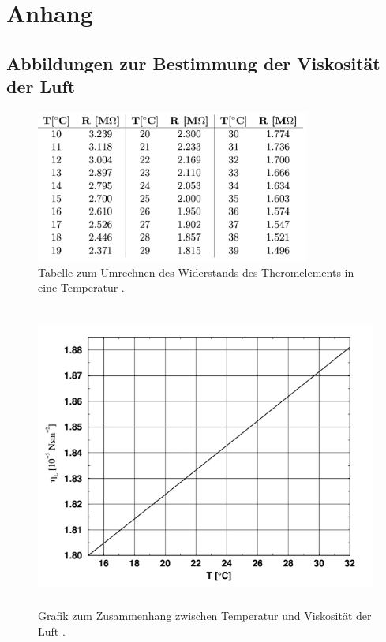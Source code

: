 \section{Anhang}
\label{sec:Anhang}
\subsection{Abbildungen zur Bestimmung der Viskosität der Luft}
\begin{figure}[H]
    \centering
    \includegraphics[height=5cm]{content/pics/R_T.png}
    \caption{Tabelle zum Umrechnen des Widerstands des Theromelements in eine Temperatur \cite{v503}.}
    \label{fig:R_T}
\end{figure}
\begin{figure}[H]
    \centering
    \includegraphics[height=10cm]{content/pics/eta_T.png}
    \caption{Grafik zum Zusammenhang zwischen Temperatur und Viskosität der Luft \cite{v503}.}
    \label{fig:eta_L}
\end{figure}

